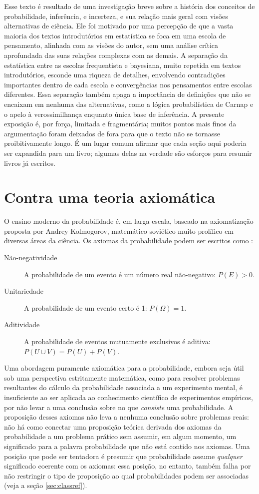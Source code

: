 Esse texto é resultado de uma investigação breve sobre a história dos conceitos de probabilidade, inferência, e incerteza,
e sua relação mais geral com visões alternativas de ciência. Ele foi motivado por uma percepção de que a vasta maioria dos
textos introdutórios em estatística se foca em uma escola de pensamento, alinhada com as visões do autor, sem uma análise crítica
aprofundada das suas relações complexas com as demais. A separação da estatística entre as escolas frequentista e bayesiana,
muito repetida em textos introdutórios, esconde uma riqueza de detalhes, envolvendo contradições importantes dentro de cada
escola e convergências nos pensamentos entre escolas diferentes. Essa separação também apaga a importância de definições que
não se encaixam em nenhuma das alternativas, como a lógica probabilística de Carnap e o apelo à verossimilhança enquanto 
única base de inferência. A presente exposição é, por força, limitada e fragmentária; muitos pontos mais finos da argumentação
foram deixados de fora para que o texto não se tornasse proibitivamente longo. É um lugar comum afirmar que cada 
seção aqui poderia ser expandida para um livro; algumas delas na verdade são esforços para resumir livros já escritos.

\section{Contra uma teoria axiomática}\label{sec:axiomatica}
O ensino moderno da probabilidade é, em larga escala, baseado na axiomatização proposta por Andrey Kolmogorov, matemático
soviético muito prolífico em diversas áreas da ciência. Os axiomas da probabilidade podem ser escritos como \citep{Morettin09}:

\begin{description}
	\item[Não-negatividade] A probabilidade de um evento é um número real não-negativo: $P(E) > 0$.
	\item[Unitariedade] A probabilidade de um evento certo é 1: $P(\Omega) = 1$.
	\item[Aditividade] A probabilidade de eventos mutuamente exclusivos é aditiva: $P(U \cup V) = P(U)+P(V)$.
\end{description}

Uma abordagem puramente axiomática para a probabilidade, embora seja útil sob uma perspectiva estritamente matemática, como
para resolver problemas resultantes do cálculo da probabilidade associada a um experimento mental, 
é insuficiente ao ser aplicada ao conhecimento científico de experimentos empíricos, por não
levar a uma conclusão sobre no que {\em consiste} uma probabilidade. A proposição desses axiomas não leva a nenhuma conclusão 
sobre problemas reais: não há como conectar uma proposição teórica derivada dos axiomas da probabilidade a um problema
prático sem assumir, em algum momento, um significado para a palavra probabilidade que não está contido nos axiomas. Uma posição
que pode ser tentadora é presumir que probabilidade assume {\em qualquer} significado coerente com os axiomas: essa posição,
no entanto, também falha por não restringir o tipo de proposição ao qual probabilidades podem ser associadas (veja a seção
\ref{sec:classref}). 

